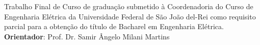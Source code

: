 \documentclass[12pt,           %
a4paper,                       %
openany,                       %
oneside,                       %
chapter=TITLE,                 %
english,                       %
spanish,                       %
brazil,                        %
sumario=tradicional]{abntex2}  %
\begin{document}
	\hspace{7cm}                                        %
	\begin{minipage}{0.58\textwidth}
		\begin{SingleSpace}                             %
		Trabalho Final de Curso de graduação submetido à Coordenadoria do Curso de Engenharia Elétrica da Universidade Federal de São João del-Rei como requisito parcial para a obtenção do título de Bacharel em Engenharia Elétrica.\\

		\textbf{Orientador}: Prof. Dr. Samir Ângelo Milani Martins
	\end{SingleSpace}                               %
\end{minipage}
\vspace{2cm}
\begin{center}
	\textbf{\imprimirlocal \\ \imprimirdata}
\end{center}  

	
\end{document}
